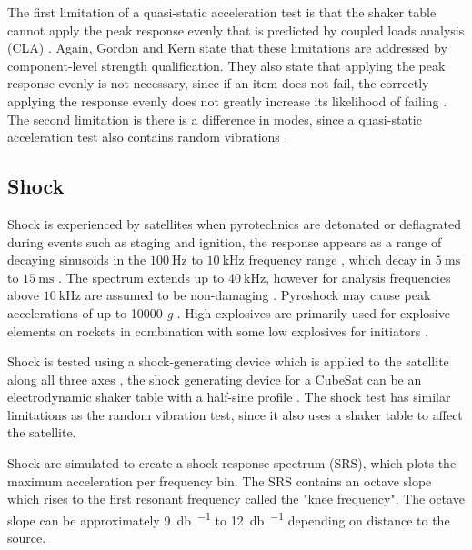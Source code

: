 \documentclass{report}
\begin{document}
The first limitation of a quasi-static acceleration test is that the shaker table cannot apply the peak response evenly that is predicted by coupled loads analysis (CLA) \cite{gordon2015benefits}. Again, Gordon and Kern state that these limitations are addressed by component-level strength qualification. They also state that applying the peak response evenly is not necessary, since if an item does not fail, the correctly applying the response evenly does not greatly increase its likelihood of failing \cite{gordon2015benefits}. The second limitation is there is a difference in modes, since a quasi-static acceleration test also contains random vibrations \cite{gordon2015benefits}.

\subsection{Shock}

Shock is experienced by satellites when pyrotechnics are detonated or deflagrated during events such as staging and ignition, the response appears as a range of decaying sinusoids in the $\SI{100}{\hertz}$ to $\SI{10}{\kilo\hertz}$ frequency range \cite{brown_elements_2002}, which decay in $\SI{5}{\milli\second}$ to $\SI{15}{\milli\second}$ \cite{brown_elements_2002}. The spectrum extends up to $\SI{40}{\kilo\hertz}$, however for analysis frequencies above $\SI{10}{\kilo\hertz}$ are assumed to be non-damaging \cite{bement1995manual,nasa-pyroshock}. Pyroshock may cause peak accelerations of up to 10000 \textit{g} \cite{nasa-pyroshock}. High explosives are primarily used for explosive elements on rockets in combination with some low explosives for initiators \cite{bement1995manual}.

Shock is tested using a shock-generating device which is applied to the satellite along all three axes \cite{nasa-gevs,nasa-pyroshock}, the shock generating device for a CubeSat can be an electrodynamic shaker table \cite{nieto2019cubesat} with a half-sine profile \cite{nieto2019cubesat}. The shock test has similar limitations as the random vibration test, since it also uses a shaker table to affect the satellite.

Shock are simulated to create a shock response spectrum (SRS), which plots the maximum acceleration per frequency bin. The SRS contains an octave slope which rises to the first resonant frequency called the "knee frequency". The octave slope can be approximately \SI{9}{\decibel\per\octave} to \SI{12}{\decibel\per\octave} depending on distance to the source.
\end{document}
